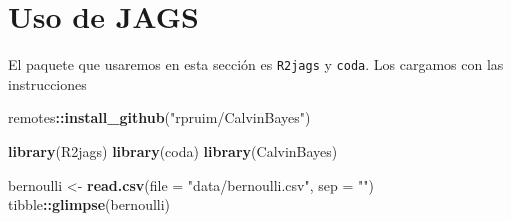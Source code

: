 \documentclass[
  12pt,
]{book}
\newenvironment{Shaded}{\begin{snugshade}}{\end{snugshade}}
\newcommand{\DataTypeTok}[1]{\textcolor[rgb]{0.13,0.29,0.53}{#1}}
\newcommand{\DecValTok}[1]{\textcolor[rgb]{0.00,0.00,0.81}{#1}}
\newcommand{\FloatTok}[1]{\textcolor[rgb]{0.00,0.00,0.81}{#1}}
\newcommand{\KeywordTok}[1]{\textcolor[rgb]{0.13,0.29,0.53}{\textbf{#1}}}
\newcommand{\NormalTok}[1]{#1}
\newcommand{\OperatorTok}[1]{\textcolor[rgb]{0.81,0.36,0.00}{\textbf{#1}}}
\newcommand{\StringTok}[1]{\textcolor[rgb]{0.31,0.60,0.02}{#1}}
\theoremstyle{definition}
\theoremstyle{definition}
\theoremstyle{definition}
\theoremstyle{remark}
\begin{document}
\begin{Shaded}
\end{Shaded}

\hypertarget{uso-de-jags}{%
\section{Uso de JAGS}\label{uso-de-jags}}

El paquete que usaremos en esta sección es \texttt{R2jags} y \texttt{coda}. Los cargamos con las instrucciones

\begin{Shaded}
\begin{Highlighting}[]
\NormalTok{remotes}\OperatorTok{::}\KeywordTok{install_github}\NormalTok{(}\StringTok{"rpruim/CalvinBayes"}\NormalTok{)}
\end{Highlighting}
\end{Shaded}

\begin{Shaded}
\begin{Highlighting}[]
\KeywordTok{library}\NormalTok{(R2jags)}
\KeywordTok{library}\NormalTok{(coda)}
\KeywordTok{library}\NormalTok{(CalvinBayes)}
\end{Highlighting}
\end{Shaded}

\begin{Shaded}
\begin{Highlighting}[]
\NormalTok{bernoulli <-}\StringTok{ }\KeywordTok{read.csv}\NormalTok{(}\DataTypeTok{file =} \StringTok{"data/bernoulli.csv"}\NormalTok{, }
    \DataTypeTok{sep =} \StringTok{""}\NormalTok{)}
\NormalTok{tibble}\OperatorTok{::}\KeywordTok{glimpse}\NormalTok{(bernoulli)}
\end{Highlighting}
\end{Shaded}
\end{document}
